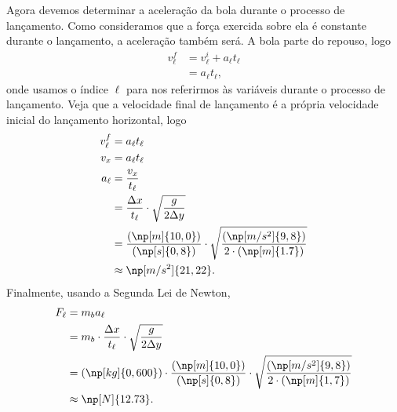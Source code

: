 Agora devemos determinar a aceleração da bola durante o processo de lançamento. Como consideramos que a força exercida sobre ela é constante durante o lançamento, a aceleração também será. A bola parte do repouso, logo
\begin{align}
    v_\ell^f &= v_\ell^i + a_\ell t_\ell \\
    &= a_\ell t_\ell,
\end{align}
%
onde usamos o índice $\ell$ para nos referirmos às variáveis durante o processo de lançamento. Veja que a velocidade final de lançamento é a própria velocidade inicial do lançamento horizontal, logo
\begin{align}
    v_\ell^f &= a_\ell t_\ell \\
    v_x &= a_\ell t_\ell \\
    a_\ell &=\frac{v_x}{t_\ell} \\
    &= \frac{\Delta x}{t_\ell} \cdot \sqrt{\frac{g}{2\Delta y}} \\
    &= \frac{(\np[m]{10,0})}{(\np[s]{0,8})} \cdot \sqrt{\frac{(\np[m/s^2]{9,8})}{2\cdot(\np[m]{1.7})}} \\
    &\approx \np[m/s^2]{21,22}.
\end{align}
%
Finalmente, usando a Segunda Lei de Newton,
\begin{align}
    F_\ell &= m_b a_\ell \\
    &= m_b\cdot\frac{\Delta x}{t_\ell} \cdot \sqrt{\frac{g}{2\Delta y}} \\
    &= (\np[kg]{0,600}) \cdot \frac{(\np[m]{10,0})}{(\np[s]{0,8})} \cdot \sqrt{\frac{(\np[m/s^2]{9,8})}{2\cdot(\np[m]{1,7})}} \\
    &\approx \np[N]{12.73}.
\end{align}

